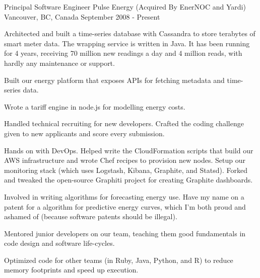 

\begin{cventries}

  \cventry
    {Principal Software Engineer} %
    {Pulse Energy (Acquired By EnerNOC and Yardi)} %
    {Vancouver, BC, Canada} %
    {September 2008 - Present} %
    {
      \begin{cvitems} %
        \item {Architected and built a time-series database with Cassandra to store terabytes of smart meter data. The wrapping service is written in Java. It has been running for 4 years, receiving 70 million new readings a day and 4 million reads, with hardly any maintenance or support.}
        \item {Built our energy platform that exposes APIs for fetching metadata and time-series data.}
        \item {Wrote a tariff engine in node.js for modelling energy costs.}
        \item {Handled technical recruiting for new developers. Crafted the coding challenge given to new applicants and score every submission.}
        \item {Hands on with DevOps. Helped write the CloudFormation scripts that build our AWS infrastructure and wrote Chef recipes to provision new nodes. Setup our monitoring stack (which uses Logstash, Kibana, Graphite, and Statsd). Forked and tweaked the open-source Graphiti project for creating Graphite dashboards.}
        \item {Involved in writing algorithms for forecasting energy use. Have my name on a patent for a algorithm for predictive energy curves, which I'm both proud and ashamed of (because software patents should be illegal).}
        \item {Mentored junior developers on our team, teaching them good fundamentals in code design and software life-cycles.}
        \item {Optimized code for other teams (in Ruby, Java, Python, and R) to reduce memory footprints and speed up execution.}
      \end{cvitems}
    }


\end{cventries}
